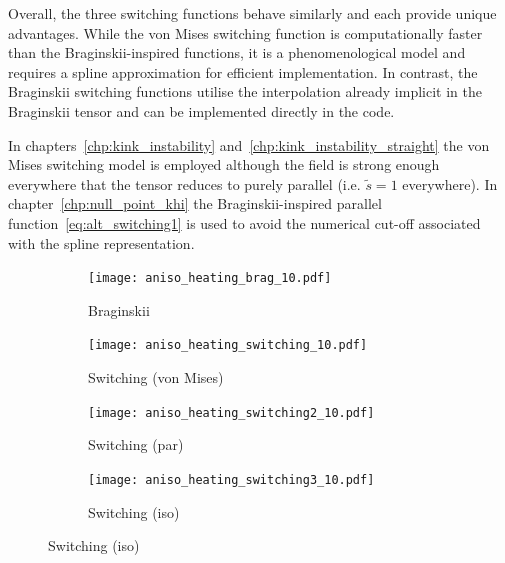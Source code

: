 Overall, the three switching functions behave similarly and each provide unique advantages. While the von Mises switching function is computationally faster than the Braginskii-inspired functions, it is a phenomenological model and requires a spline approximation for efficient implementation. In contrast, the Braginskii switching functions utilise the interpolation already implicit in the Braginskii tensor and can be implemented directly in the code. 

In chapters~\ref{chp:kink_instability} and~\ref{chp:kink_instability_straight} the von Mises switching model is employed although the field is strong enough everywhere that the tensor reduces to purely parallel (i.e. $\tilde{s} = 1$ everywhere). In chapter~\ref{chp:null_point_khi} the Braginskii-inspired parallel function~\eqref{eq:alt_switching1} is used to avoid the numerical cut-off associated with the spline representation.

\begin{figure}[t]
    \hfill
    \begin{subfigure}{0.49\textwidth}
      \texttt{[image: aniso\_heating\_brag\_10.pdf]}
      \caption{Braginskii}%
      \label{fig:aniso_heating_brag_10}
    \end{subfigure}
    \hfill
    \begin{subfigure}{0.49\textwidth}
      \texttt{[image: aniso\_heating\_switching\_10.pdf]}
      \caption{Switching (von Mises)}%
      \label{fig:aniso_heating_switching_10}
    \end{subfigure}
    \hfill
    \begin{subfigure}{0.49\textwidth}
      \texttt{[image: aniso\_heating\_switching2\_10.pdf]}
      \caption{Switching (par)}%
      \label{fig:aniso_heating_switching2_10}
    \end{subfigure}
    \hfill
    \begin{subfigure}{0.49\textwidth}
      \texttt{[image: aniso\_heating\_switching3\_10.pdf]}
      \caption{Switching (iso)}%
      \label{fig:aniso_heating_switching3_10}
    \end{subfigure}
\label{fig:anisotropic_heating}%
\end{figure}

